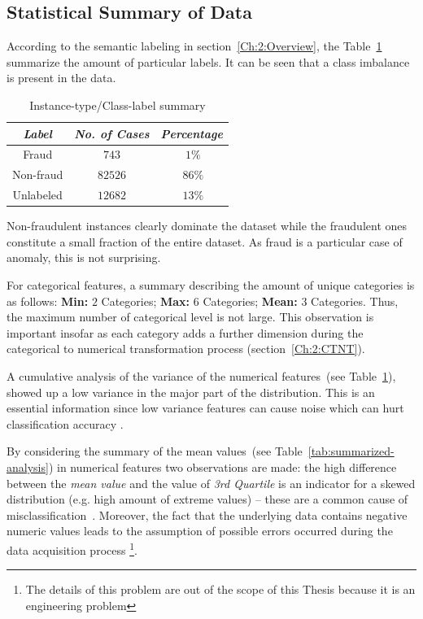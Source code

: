 \subsection{Statistical Summary of Data}\label{Ch:2:SSummary}

According to the semantic labeling in section~\ref{Ch:2:Overview}, the Table~\ref{tab:instance-summary} summarize the amount of particular labels. It can be seen that a class imbalance is present in the data.

\begin{table}[h!]
  \begin{center}
    \caption{Instance-type/Class-label summary}
    \label{tab:instance-summary}
    \begin{tabular}{|c|c|c|}\hline
    \textit{Label} & \textit{No. of Cases} & \textit{Percentage} \\
      \hline
     Fraud & \(743\) & \(~1\%\) \\ 
     \hline
     Non-fraud & \(82526\) &  \(~86\%\) \\
     \hline
     Unlabeled & \(12682\) &  \(~13\%\) \\
     \hline
    \end{tabular}
  \end{center}
\end{table}

Non-fraudulent instances clearly dominate the dataset while the fraudulent ones constitute a small fraction of the entire dataset. As fraud is a particular case of anomaly, this is not surprising.

For categorical features, a summary describing the amount of unique categories is as follows: \textbf{Min:} \(2\) Categories; \textbf{Max:} \(6\) Categories; \textbf{Mean:} \(3\) Categories. Thus, the maximum number of categorical level is not large.
This observation is important insofar as each category adds a further dimension during the categorical to numerical transformation process (section~\ref{Ch:2:CTNT}).

A cumulative analysis of the variance of the numerical features~(see Table~\ref{tab:instance-summary}), showed up a low variance in the major part of the distribution. This is an essential information since low variance features can cause noise which can hurt classification accuracy \cite{conf/pkdd/MunsonC09}. 

By considering the summary of the mean values~(see Table~\ref{tab:summarized-analysis}) in numerical features two observations are made: the high difference between the \textit{mean value} and the value of \textit{3rd Quartile} is an indicator for a skewed distribution (e.g. high amount of extreme values) --  these are a common cause of misclassification~\cite{journals/adac/HubertV10}. Moreover, the fact that the underlying data contains negative numeric values leads to the assumption of possible errors occurred during the data acquisition process \footnote{The details of this problem are out of the scope of this Thesis because it is an engineering problem}.

